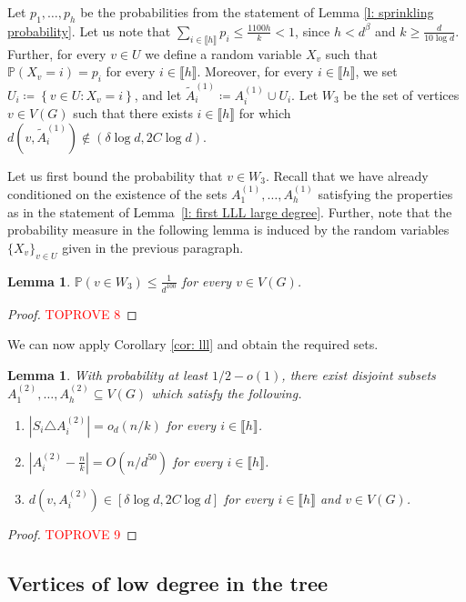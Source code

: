 \documentclass[notitlepage]{scrartcl}
\newcommand{\br}[1]{\llbracket{#1}\rrbracket}
\newtheorem{lemma}[thm]{Lemma}
\begin{document}
Let $p_1,\ldots, p_h$ be the probabilities from the statement of Lemma \ref{l: sprinkling probability}. Let us note that $\sum_{i\in \br{h}}p_i\le \frac{1100h}{k}<1$, since $h< d^\beta$ and $k\ge \frac{d}{10\log d}$. Further, for every $v\in U$ we define a random variable $X_v$ such that $\mathbb{P}\left(X_v=i\right)=p_i$ for every $i\in \br{h}$. Moreover, for every $i\in \br{h}$, we set $U_i\coloneqq\left\{v\in U\colon X_v=i\right\}$, and let $\tilde{A}_i^{(1)}\coloneqq A_i^{(1)}\cup U_i$. Let $W_3$ be the set of vertices $v\in V(G)$ such that there exists $i\in \br{h}$ for which $d(v,\tilde{A}_i^{(1)})\notin (\delta\log d, 2C\log d)$. 

Let us first bound the probability that $v\in W_3$. Recall that we have already conditioned on the existence of the sets $A_1^{(1)}, \ldots, A_h^{(1)}$ satisfying the properties as in the statement of Lemma~\ref{l: first LLL large degree}. Further, note that the probability measure in the following lemma is induced by the random variables $\{X_v\}_{v \in U}$ given in the previous paragraph.
\begin{lemma}\label{l: W_2 probability}
$\mathbb{P}\left(v\in W_3\right)\le \frac{1}{d^{100}}$ for every $v\in V(G)$.
\end{lemma}
\begin{proof}\textcolor{red}{TOPROVE 8}\end{proof}

We can now apply Corollary \ref{cor: lll} and obtain the required sets.
\begin{lemma}\label{l: second lll}
With probability at least $1/2-o(1)$, there exist disjoint subsets $A_1^{(2)},\ldots, A_h^{(2)}\subseteq V(G)$ which satisfy the following.
\begin{enumerate}
    \item $\left|S_i\triangle A_i^{(2)}\right|=o_d(n/k)$ for every $i\in \br{h}$.
    \item $\left|A_i^{(2)}-\frac{n}{k}\right|=O(n/d^{50})$ for every $i\in \br{h}$. 
    \item $d(v, A_i^{(2)})\in \left[\delta \log d, 2C\log d\right]$ for every $i\in \br{h}$ and $v\in V(G)$.
\end{enumerate}
\end{lemma}
\begin{proof}\textcolor{red}{TOPROVE 9}\end{proof}

\subsection{Vertices of low degree in the tree}\label{s: low degree}
\end{document}
